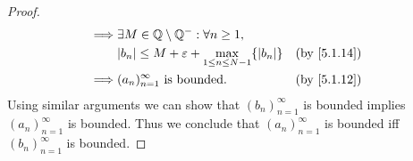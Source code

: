 \begin{proof}
\begin{align*}
    \implies & \exists M \in \Q \setminus \Q^- : \forall n \geq 1,                                                              \\
             & \abs{b_n} \leq M + \varepsilon + \max_{1 \leq n \leq N - 1}\set{\abs{b_n}}                  &  & \by{5.1.14}     \\
    \implies & (a_n)_{n = 1}^\infty \text{ is bounded}.                                                    &  & \by{5.1.12}
  \end{align*}
  Using similar arguments we can show that \((b_n)_{n = 1}^\infty\) is bounded implies \((a_n)_{n = 1}^\infty\) is bounded.
  Thus we conclude that \((a_n)_{n = 1}^\infty\) is bounded iff \((b_n)_{n = 1}^\infty\) is bounded.
\end{proof}
